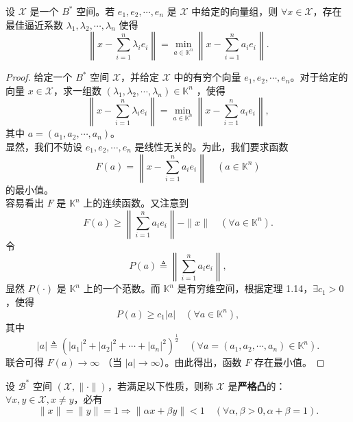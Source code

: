 \documentclass[lang=cn,newtx,10pt,scheme=chinese,thmcnt=chapter]{elegantbook}
\begin{document}
\begin{theorem}
设 $\mathscr{X}$ 是一个 ${B}^*$ 空间。若 $e_1, e_2, \cdots, e_n$ 是 $\mathscr{X}$ 中给定的向量组，则 $\forall x \in \mathscr{X}$，存在最佳逼近系数 $\lambda_1, \lambda_2, \cdots, \lambda_n$ 使得
\[
\left\|x - \sum_{i=1}^n \lambda_i e_i\right\| = \min_{a \in \mathbb{K}^n} \left\|x - \sum_{i=1}^n a_i e_i\right\|.
\]
\end{theorem}
\begin{proof}
给定一个 $B^*$ 空间 $\mathscr{X}$，并给定 $\mathscr{X}$ 中的有穷个向量 $e_1, e_2, \cdots, e_n$。对于给定的向量 $x \in \mathscr{X}$，求一组数 $\left(\lambda_1, \lambda_2, \cdots, \lambda_n\right) \in \mathbb{K}^n$ ，使得
\begin{equation}
\left\|x-\sum_{i=1}^n \lambda_i e_i\right\|=\min _{a \in \mathbb{K}^n}\left\|x-\sum_{i=1}^n a_i e_i\right\|,
\end{equation}
其中 $a = \left(a_1, a_2, \cdots, a_n\right)$。\\
显然，我们不妨设 $e_1, e_2, \cdots, e_n$ 是线性无关的。为此，我们要求函数
\[
F(a)=\left\|x-\sum_{i=1}^n a_i e_i\right\| \quad \left(a \in \mathbb{K}^n\right)
\]
的最小值。\\
容易看出 $F$ 是 $\mathbb{K}^n$ 上的连续函数。又注意到
\[
F(a) \geqslant\left\|\sum_{i=1}^n a_i e_i\right\|-\|x\| \quad \left(\forall a \in \mathbb{K}^n\right).
\]
令
\[
P(a) \triangleq\left\|\sum_{i=1}^n a_i e_i\right\|,
\]
显然 $P(\cdot)$ 是 $\mathbb{K}^n$ 上的一个范数。而 $\mathbb{K}^n$ 是有穷维空间，根据定理 1.14，$\exists c_1 > 0$ ，使得
\[
P(a) \geqslant c_1 |a| \quad \left(\forall a \in \mathbb{K}^n\right),
\]
其中
\[
|a| \triangleq\left(\left|a_1\right|^2 + \left|a_2\right|^2 + \cdots + \left|a_n\right|^2\right)^{\frac{1}{2}} \quad \left(\forall a = \left(a_1, a_2, \cdots, a_n\right) \in \mathbb{K}^n\right).
\]
联合可得 $F(a) \to \infty$ （当 $|a| \to \infty$）。由此得出，函数 $F$ 存在最小值。
\end{proof}
\begin{definition}
设 $\mathscr{B}^*$ 空间 $(\mathscr{X}, \|\cdot\|)$，若满足以下性质，则称 $\mathscr{X}$ 是\textbf{严格凸}的：  
$\forall x, y \in \mathscr{X}, x \neq y$，必有  
\[
\|x\| = \|y\| = 1 \Longrightarrow \|\alpha x + \beta y\| < 1 \quad (\forall \alpha, \beta > 0, \alpha + \beta = 1).
\]
\end{definition}
\end{document}
